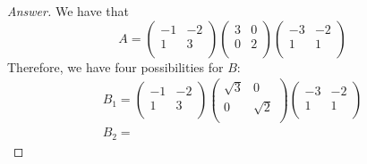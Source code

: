 \documentclass[../psets.tex]{subfiles}
\begin{document}
\begin{enumerate}[label={\textbf{2.\arabic*.}}]
\begin{proof}[Answer]




        We have that
        \begin{equation*}
            A =
            \begin{pmatrix}
                -1 & -2\\
                1 & 3\\
            \end{pmatrix}
            \begin{pmatrix}
                3 & 0\\
                0 & 2\\
            \end{pmatrix}
            \begin{pmatrix}
                -3 & -2\\
                1 & 1\\
            \end{pmatrix}
        \end{equation*}
        Therefore, we have four possibilities for $B$:
        \begin{gather*}
            B_1 =
            \begin{pmatrix}
                -1 & -2\\
                1 & 3\\
            \end{pmatrix}
            \begin{pmatrix}
                \sqrt{3} & 0\\
                0 & \sqrt{2}\\
            \end{pmatrix}
            \begin{pmatrix}
                -3 & -2\\
                1 & 1\\
            \end{pmatrix}\\
            B_2 =

\end{gather*}
\end{proof}
\end{enumerate}
\end{document}
